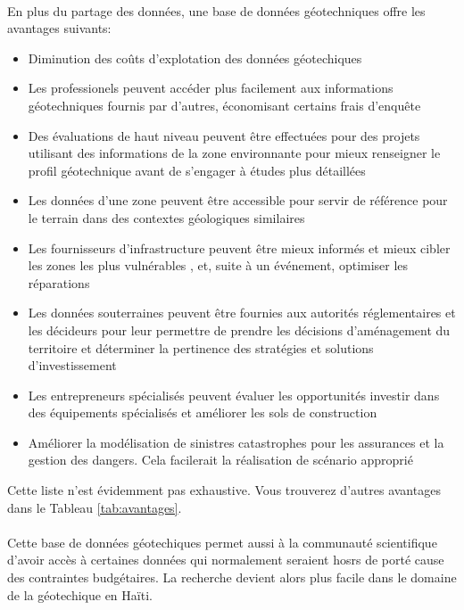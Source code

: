\paragraph{}
En plus du partage des données, une base de données géotechniques
offre les avantages suivants:
\begin{itemize}
    \item Diminution des coûts d'explotation des données géotechiques
    \item Les professionels peuvent accéder plus facilement aux informations géotechniques
    fournis par d'autres, économisant certains frais d'enquête
    \item Des évaluations de haut niveau peuvent être effectuées pour des
    projets utilisant des informations de la zone environnante pour
    mieux renseigner le profil géotechnique avant de s'engager à
    études plus détaillées
    \item Les données d'une zone peuvent être
    accessible pour servir de référence pour le terrain  dans des contextes géologiques similaires
    \item Les fournisseurs d'infrastructure peuvent être mieux informés
    et mieux cibler les zones les plus vulnérables , et, suite à un événement, optimiser les réparations
    \item  Les données souterraines peuvent être fournies aux autorités réglementaires
    et les décideurs pour leur permettre de prendre
    les décisions d'aménagement du territoire et déterminer la pertinence
    des stratégies et solutions d'investissement
    \item  Les entrepreneurs spécialisés peuvent évaluer les opportunités
    investir dans des équipements spécialisés et améliorer les sols de construction
    \item Améliorer la modélisation de sinistres catastrophes pour les assurances et
    la gestion des dangers. Cela facilerait la réalisation de scénario approprié    
\end{itemize}
Cette liste n'est évidemment pas exhaustive. Vous trouverez d'autres avantages dans le Tableau \ref{tab:avantages}.

\paragraph{}
Cette base de données géotechiques permet aussi à la communauté
scientifique d'avoir accès à certaines données qui normalement seraient 
hosrs de porté cause des contraintes budgétaires. La recherche devient alors plus 
facile dans le domaine de la géotechique en Haïti.


